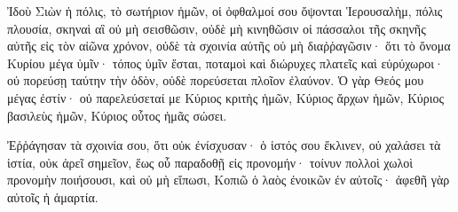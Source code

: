 {\par }{\PP {}Ἰδοὺ Σιὼν ἡ πόλις, τὸ σωτήριον ἡμῶν, οἱ ὀφθαλμοί σου ὄψονται Ἱερουσαλὴμ, πόλις πλουσία, σκηναὶ αἳ οὐ μὴ σεισθῶσιν, οὐδὲ μὴ κινηθῶσιν οἱ πάσσαλοι τῆς σκηνῆς αὐτῆς εἰς τὸν αἰῶνα χρόνον, οὐδὲ τὰ σχοινία αὐτῆς οὐ μὴ διαῤῥαγῶσιν·
ὅτι τὸ ὄνομα Κυρίου μέγα ὑμῖν· τόπος ὑμῖν ἔσται, ποταμοὶ καὶ διώρυχες πλατεῖς καὶ εὐρύχωροι· οὐ πορεύσῃ ταύτην τὴν ὁδὸν, οὐδὲ πορεύσεται πλοῖον ἐλαύνον.
Ὁ γὰρ Θεός μου μέγας ἐστίν· οὐ παρελεύσεταί με Κύριος κριτὴς ἡμῶν, Κύριος ἄρχων ἡμῶν, Κύριος βασιλεὺς ἡμῶν, Κύριος οὗτος ἡμᾶς σώσει.
\par }{\PP {}Ἐῤῥάγησαν τὰ σχοινία σου, ὅτι οὐκ ἐνίσχυσαν· ὁ ἱστός σου ἔκλινεν, οὐ χαλάσει τὰ ἱστία, οὐκ ἀρεῖ σημεῖον, ἕως οὗ παραδοθῇ εἰς προνομήν· τοίνυν πολλοὶ χωλοὶ προνομὴν ποιήσουσι,
καὶ οὐ μὴ εἴπωσι, Κοπιῶ ὁ λαὸς ἐνοικῶν ἐν αὐτοῖς· ἀφεθῆ γὰρ αὐτοῖς ἡ ἁμαρτία.

}
